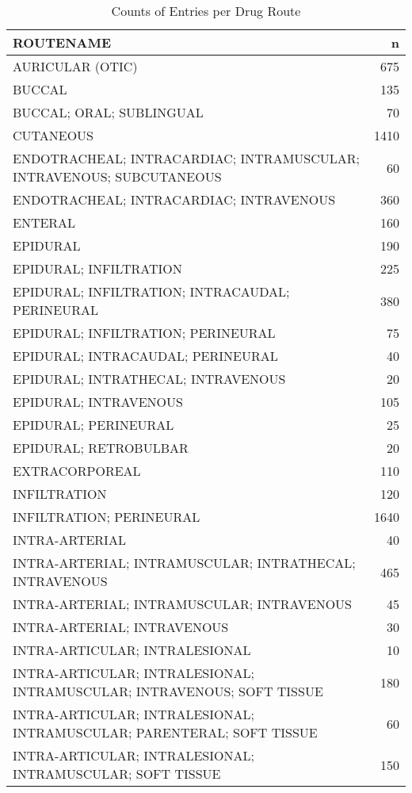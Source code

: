 \documentclass[
]{article}
\begin{document}
\begin{table}

\caption{\label{tab:unnamed-chunk-5}Counts of Entries per Drug Route}
\centering
\begin{tabular}[t]{l|r}
\hline
ROUTENAME & n\\
\hline
AURICULAR (OTIC) & 675\\
\hline
BUCCAL & 135\\
\hline
BUCCAL; ORAL; SUBLINGUAL & 70\\
\hline
CUTANEOUS & 1410\\
\hline
ENDOTRACHEAL; INTRACARDIAC; INTRAMUSCULAR; INTRAVENOUS; SUBCUTANEOUS & 60\\
\hline
ENDOTRACHEAL; INTRACARDIAC; INTRAVENOUS & 360\\
\hline
ENTERAL & 160\\
\hline
EPIDURAL & 190\\
\hline
EPIDURAL; INFILTRATION & 225\\
\hline
EPIDURAL; INFILTRATION; INTRACAUDAL; PERINEURAL & 380\\
\hline
EPIDURAL; INFILTRATION; PERINEURAL & 75\\
\hline
EPIDURAL; INTRACAUDAL; PERINEURAL & 40\\
\hline
EPIDURAL; INTRATHECAL; INTRAVENOUS & 20\\
\hline
EPIDURAL; INTRAVENOUS & 105\\
\hline
EPIDURAL; PERINEURAL & 25\\
\hline
EPIDURAL; RETROBULBAR & 20\\
\hline
EXTRACORPOREAL & 110\\
\hline
INFILTRATION & 120\\
\hline
INFILTRATION; PERINEURAL & 1640\\
\hline
INTRA-ARTERIAL & 40\\
\hline
INTRA-ARTERIAL; INTRAMUSCULAR; INTRATHECAL; INTRAVENOUS & 465\\
\hline
INTRA-ARTERIAL; INTRAMUSCULAR; INTRAVENOUS & 45\\
\hline
INTRA-ARTERIAL; INTRAVENOUS & 30\\
\hline
INTRA-ARTICULAR; INTRALESIONAL & 10\\
\hline
INTRA-ARTICULAR; INTRALESIONAL; INTRAMUSCULAR; INTRAVENOUS; SOFT TISSUE & 180\\
\hline
INTRA-ARTICULAR; INTRALESIONAL; INTRAMUSCULAR; PARENTERAL; SOFT TISSUE & 60\\
\hline
INTRA-ARTICULAR; INTRALESIONAL; INTRAMUSCULAR; SOFT TISSUE & 150\\

\end{tabular}
\end{table}
\end{document}
